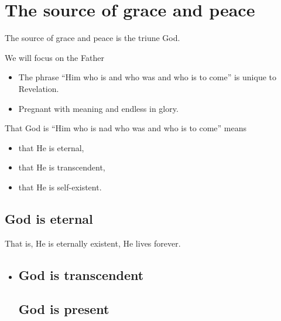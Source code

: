 \documentclass[12pt]{article}
\newcommand{\BI}{\begin{itemize}}
\newcommand{\EI}{\end{itemize}}
\newcommand{\I}{\item}
\begin{document}
\section{The source of grace and peace}
\I  The source of grace and peace is the triune God.
\I  We will focus on the Father
\BI \I  The phrase ``Him who is and who was and who is to come'' is unique to Revelation.
    \I  Pregnant with meaning and endless in glory. \EI
\I  That God is ``Him who is nad who was and who is to come'' means
\BI \I  that He is eternal,
    \I  that He is transcendent,
    \I  that He is self-existent. \EI

\subsection{God is eternal}
\I  That is, He is eternally existent, He lives forever.
\BI \I    
\subsection{God is transcendent}
\subsection{God is present}
\EI
\end{document}
